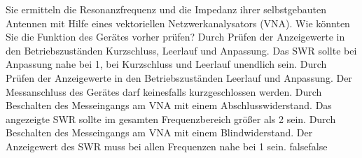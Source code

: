     {Sie ermitteln die Resonanzfrequenz und die Impedanz ihrer selbstgebauten Antennen mit Hilfe eines vektoriellen Netzwerkanalysators (VNA). Wie könnten Sie die Funktion des Gerätes vorher prüfen?}
    {Durch Prüfen der Anzeigewerte in den Betriebszuständen Kurzschluss, Leerlauf und Anpassung. Das SWR sollte bei Anpassung nahe bei 1, bei Kurzschluss und Leerlauf unendlich sein.}
    {Durch Prüfen der Anzeigewerte in den Betriebszuständen Leerlauf und Anpassung. Der Messanschluss des Gerätes darf keinesfalls kurzgeschlossen werden.}
    {Durch Beschalten des Messeingangs am VNA mit einem Abschlusswiderstand. Das angezeigte SWR sollte im gesamten Frequenzbereich größer als 2 sein.}
    {Durch Beschalten des Messeingangs am VNA mit einem Blindwiderstand. Der Anzeigewert des SWR muss bei allen Frequenzen nahe bei 1 sein.}
    {false}{false}